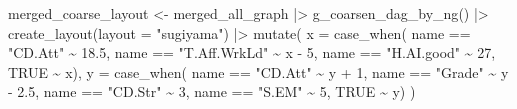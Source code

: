 \documentclass[
  letterpaper,
  DIV=11,
  numbers=noendperiod]{scrartcl}
\newenvironment{Shaded}{\begin{snugshade}}{\end{snugshade}}
\newcommand{\AttributeTok}[1]{\textcolor[rgb]{0.40,0.45,0.13}{#1}}
\newcommand{\ConstantTok}[1]{\textcolor[rgb]{0.56,0.35,0.01}{#1}}
\newcommand{\DecValTok}[1]{\textcolor[rgb]{0.68,0.00,0.00}{#1}}
\newcommand{\FloatTok}[1]{\textcolor[rgb]{0.68,0.00,0.00}{#1}}
\newcommand{\FunctionTok}[1]{\textcolor[rgb]{0.28,0.35,0.67}{#1}}
\newcommand{\NormalTok}[1]{\textcolor[rgb]{0.00,0.23,0.31}{#1}}
\newcommand{\OtherTok}[1]{\textcolor[rgb]{0.00,0.23,0.31}{#1}}
\newcommand{\SpecialCharTok}[1]{\textcolor[rgb]{0.37,0.37,0.37}{#1}}
\newcommand{\StringTok}[1]{\textcolor[rgb]{0.13,0.47,0.30}{#1}}
\begin{document}
\begin{Shaded}
\begin{Highlighting}[]
\NormalTok{merged\_coarse\_layout }\OtherTok{\textless{}{-}} 
\NormalTok{    merged\_all\_graph }\SpecialCharTok{|\textgreater{}} 
    \FunctionTok{g\_coarsen\_dag\_by\_ng}\NormalTok{() }\SpecialCharTok{|\textgreater{}} 
    \FunctionTok{create\_layout}\NormalTok{(}\AttributeTok{layout =} \StringTok{"sugiyama"}\NormalTok{) }\SpecialCharTok{|\textgreater{}} 
    \FunctionTok{mutate}\NormalTok{(}
        \AttributeTok{x =} \FunctionTok{case\_when}\NormalTok{(}
\NormalTok{            name }\SpecialCharTok{==} \StringTok{"CD.Att"} \SpecialCharTok{\textasciitilde{}} \FloatTok{18.5}\NormalTok{,}
\NormalTok{            name }\SpecialCharTok{==} \StringTok{"T.Aff.WrkLd"} \SpecialCharTok{\textasciitilde{}}\NormalTok{ x }\SpecialCharTok{{-}} \DecValTok{5}\NormalTok{,}
\NormalTok{            name }\SpecialCharTok{==} \StringTok{"H.AI.good"} \SpecialCharTok{\textasciitilde{}} \DecValTok{27}\NormalTok{,}
            \ConstantTok{TRUE} \SpecialCharTok{\textasciitilde{}}\NormalTok{ x),}
        \AttributeTok{y =} \FunctionTok{case\_when}\NormalTok{(}
\NormalTok{            name }\SpecialCharTok{==} \StringTok{"CD.Att"} \SpecialCharTok{\textasciitilde{}}\NormalTok{ y }\SpecialCharTok{+} \DecValTok{1}\NormalTok{,}
\NormalTok{            name }\SpecialCharTok{==} \StringTok{"Grade"} \SpecialCharTok{\textasciitilde{}}\NormalTok{ y }\SpecialCharTok{{-}} \FloatTok{2.5}\NormalTok{,}
\NormalTok{            name }\SpecialCharTok{==} \StringTok{"CD.Str"} \SpecialCharTok{\textasciitilde{}} \DecValTok{3}\NormalTok{,}
\NormalTok{            name }\SpecialCharTok{==} \StringTok{"S.EM"} \SpecialCharTok{\textasciitilde{}} \DecValTok{5}\NormalTok{,}
            \ConstantTok{TRUE} \SpecialCharTok{\textasciitilde{}}\NormalTok{ y)}
\NormalTok{           )}


\end{Highlighting}
\end{Shaded}
\end{document}
